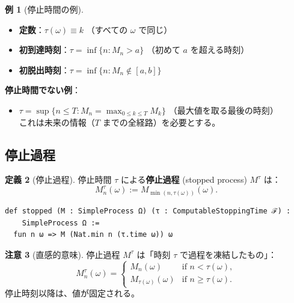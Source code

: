 \documentclass[a4paper,12pt]{ltjsarticle}
\theoremstyle{definition}
\newtheorem{definition}{定義}[section]
\newtheorem{example}[definition]{例}
\newtheorem{remark}[definition]{注意}
\begin{document}
\begin{example}[停止時間の例]
\begin{itemize}
  \item \textbf{定数}：$\tau(\omega) \equiv k$ （すべての $\omega$ で同じ）
  \item \textbf{初到達時刻}：$\tau = \inf\{n : M_n > a\}$ （初めて $a$ を超える時刻）
  \item \textbf{初脱出時刻}：$\tau = \inf\{n : M_n \notin [a,b]\}$
\end{itemize}

\textbf{停止時間でない例}：
\begin{itemize}
  \item $\tau = \sup\{n \leq T : M_n = \max_{0 \leq k \leq T} M_k\}$ （最大値を取る最後の時刻）\\
  これは未来の情報（$T$ までの全経路）を必要とする。
\end{itemize}
\end{example}

\subsection{停止過程}

\begin{definition}[停止過程]
停止時間 $\tau$ による\textbf{停止過程} (stopped process) $M^\tau$ は：
\[
  M^\tau_n(\omega) := M_{\min(n, \tau(\omega))}(\omega).
\]
\end{definition}

\begin{codebox}
\begin{verbatim}
def stopped (M : SimpleProcess Ω) (τ : ComputableStoppingTime ℱ) :
    SimpleProcess Ω :=
  fun n ω => M (Nat.min n (τ.time ω)) ω
\end{verbatim}
\end{codebox}

\begin{remark}[直感的意味]
停止過程 $M^\tau$ は「時刻 $\tau$ で過程を凍結したもの」：
\[
  M^\tau_n(\omega) = \begin{cases}
    M_n(\omega) & \text{if } n < \tau(\omega), \\
    M_{\tau(\omega)}(\omega) & \text{if } n \geq \tau(\omega).
  \end{cases}
\]
停止時刻以降は、値が固定される。
\end{remark}
\end{document}
